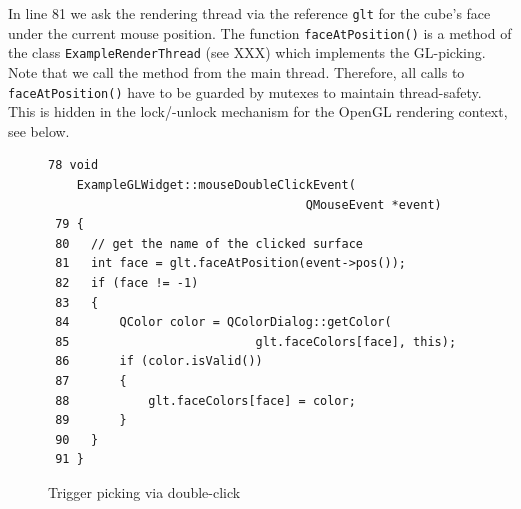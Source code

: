 \documentclass[jou,noapacite]{apa}
\begin{document}
In line 81 we ask the rendering thread via the reference \lstinline|glt| for the
cube's face under the current mouse position.
%
The function \lstinline|faceAtPosition()| is a method of the
class \lstinline|ExampleRenderThread| (see XXX) which implements the
GL-picking.
%
Note that we call the method from the main thread.
%
Therefore, all calls to \lstinline|faceAtPosition()| have to be guarded by
mutexes to maintain thread-safety.
%
This is hidden in the lock/-unlock mechanism for the OpenGL rendering context,
see below.
\begin{figure}[h]
\begin{lstlisting}[basicstyle=\scriptsize]
 78 void
    ExampleGLWidget::mouseDoubleClickEvent(
                                    QMouseEvent *event)
 79 {
 80   // get the name of the clicked surface
 81   int face = glt.faceAtPosition(event->pos());
 82   if (face != -1)
 83   {
 84       QColor color = QColorDialog::getColor(
 85                          glt.faceColors[face], this);
 86       if (color.isValid())
 87       {
 88           glt.faceColors[face] = color;
 89       }
 90   }
 91 }
\end{lstlisting}
\caption{Trigger picking via double-click}
\end{figure}
\end{document}
